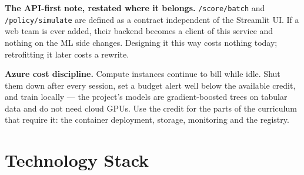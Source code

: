 \documentclass[11pt,a4paper]{article}
\begin{document}
\begin{keybox}
\textbf{The API-first note, restated where it belongs.} \texttt{/score/batch} and
\texttt{/policy/simulate} are defined as a contract independent of the Streamlit UI. If a web team
is ever added, their backend becomes a client of this service and nothing on the ML side changes.
Designing it this way costs nothing today; retrofitting it later costs a rewrite.
\end{keybox}

\begin{alertbox}
\textbf{Azure cost discipline.} Compute instances continue to bill while idle. Shut them down after
every session, set a budget alert well below the available credit, and train locally --- the
project's models are gradient-boosted trees on tabular data and do not need cloud GPUs. Use the
credit for the parts of the curriculum that require it: the container deployment, storage,
monitoring and the registry.
\end{alertbox}

\section{Technology Stack}
\end{document}
